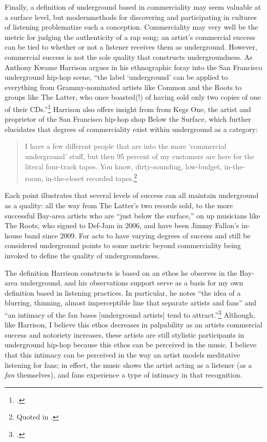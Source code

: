 Finally, a definition of underground based in commerciality may seem valuable at a surface 
level, but modernmethods for discovering and participating in cultures of listening problematize
such a conception. Commerciality may very well be the metric for judging the authenticity of a 
rap song; an artist's commercial success can be tied to whether or not a listener receives them 
as  underground. However, commercial success is not the sole quality that constructs undergroundness. 
As Anthony Kwame Harrison argues in his ethnographic foray into the San Francisco underground 
hip-hop scene, ``the label `underground' can be applied to everything from Grammy-nominated 
artists like Common and the Roots to groups like The Latter, who once boasted(!) of having sold
only two copies of one of their CDs.''\footnote{
    \autocite[9]{anthonykwameharrisonHipHopUnderground2009}.}
Harrison also offers insight from from Kegs One, the artist and proprietor of the San Francisco 
hip-hop shop Below the Surface, which further elucidates that degrees of commerciality exist 
within underground as a category:
    \begin{quote}
        \small I have a few different people that are into the more `commercial underground' stuff, 
        but then 95 percent of my customers are here for the  literal four-track tapes. You 
        know,  dirty-sounding, low-budget, in-the-room, in-the-closet recorded 
        tapes.\footnote{
            Quoted in \autocite[10]{anthonykwameharrisonHipHopUnderground2009}.}
    \end{quote}
Each point illustrates that several levels of success can all maintain underground as a quality:
all the way from The Latter's two records sold, to the more successful Bay-area artists who are
``just below the surface,'' on up musicians like The Roots, who signed to Def-Jam in 2006, and 
have been Jimmy Fallon's in-house band since 2009. For acts to have varying degrees of success 
and still be considered underground points to some metric beyond commerciality being invoked to 
define the quality of undergroundness.

The definition Harrison constructs is based on an ethos he observes in the Bay-area underground,
and his observations support serve as a basis for my own definition based in listening practices.
In particular, he notes ``the idea of a blurring, thinning, almost imperceptible line that separate
artists and fans'' and ``an intimacy of the fan bases [underground artists] tend to 
attract.''\footnote{
    \autocite[10--11]{anthonykwameharrisonHipHopUnderground2009}.}
Although, like Harrison, I believe this ethos decreases in palpability as an artists commercial 
success and notoriety increases, these artists are still stylistic participants in underground 
hip-hop because this ethos can be perceived in the music. I believe that this intimacy can be 
perceived in the way an artist models meditative listening for fans; in effect, the music shows
the artist acting as a listener (as a \emph{fan} themselves), and fans experience a type of
intimacy in that recognition.

